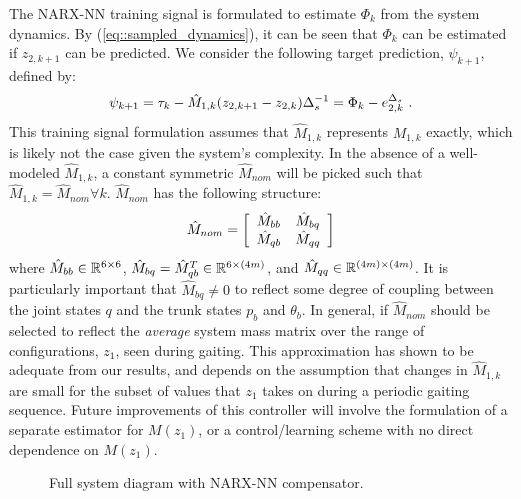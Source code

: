 The  NARX-NN training signal is formulated to estimate $\Phi_{k}$ from the system dynamics. By (\ref{eq::sampled_dynamics}), it can be seen that $\Phi_{k}$ can be estimated if ${z}_{2,k+1}$ can be predicted. We consider the following target prediction, $\psi_{k+1}$,  defined by:
	\vspace{-2mm}
	\begin{equation}
		\vspace{-1.5mm}
		\psi_{k+1} = \tau_{k} - \hat{M}_{1,k}({z}_{2,k+1} - {z}_{2,k})\Delta_{s}^{-1} = \Phi_{k} - {e}_{2,k}^{\Delta_{s}} \text{ .}
		\label{eq::training_signal}
	\end{equation}
This training signal formulation assumes that $\hat{M}_{1,k}$ represents $M_{1,k}$ exactly, which is likely not the case given the system's complexity. In the absence of a well-modeled $\hat{M}_{1,k}$, a constant symmetric $\hat{M}_{nom}$  will be picked such that $\hat{M}_{1,k} = \hat{M}_{nom} \forall k$. $\hat{M}_{nom}$ has the following structure:
	\begin{equation}
		\vspace{-1.5mm}
		\hat{M}_{nom} = \left[
			\begin{array}{cc}
			\hat{M}_{bb}	&	 \hat{M}_{bq}\\
			\hat{M}_{qb}	&	 \hat{M}_{qq}
			\end{array}
		\right]
	\end{equation}
where 	$\hat{M}_{bb}\in \mathbb{R}^{6\times6}$, 
		$\hat{M}_{bq}=\hat{M}_{qb}^{T} \in \mathbb{R}^{6\times(4m)}$, and  
		$\hat{M}_{qq}\in \mathbb{R}^{(4m)\times(4m)}$. 
It is particularly important that $\hat{M}_{bq}\neq0$ to reflect some degree of coupling between the joint states $q$ and the trunk states $p_{b}$ and $\theta_{b}$. In general, if $\hat{M}_{nom}$ should be selected to reflect the \emph{average} system mass matrix over the range of configurations, $z_{1}$, seen during gaiting. This approximation has shown to be adequate from our results, and depends on the assumption that changes in $\hat{M}_{1,k}$ are small for the subset of values that $z_{1}$ takes on during a periodic gaiting sequence. Future improvements of this controller will involve the formulation of a separate estimator for $M(z_{1})$, or a control/learning scheme with no direct dependence on $M(z_{1})$.
	\begin{figure}[t!]
		\centering
		\caption{Full system diagram with NARX-NN compensator.}
		\label{fig::sys_diagram}
		\vspace{-5.5mm}
	\end{figure}


